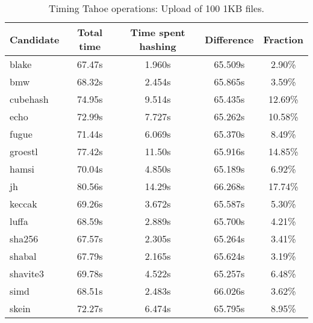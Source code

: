 \begin{table}[h]
  \centering
  \begin{tabular}{ | l | c | c | c | c | }
    \hline
    Candidate & Total time & Time spent hashing & Difference & Fraction \\ \hline
    blake & 67.47s & 1.960s & 65.509s & 2.90\% \\ \hline
    bmw & 68.32s & 2.454s & 65.865s & 3.59\% \\ \hline
    cubehash & 74.95s & 9.514s & 65.435s & 12.69\% \\ \hline
    echo & 72.99s & 7.727s & 65.262s & 10.58\% \\ \hline
    fugue & 71.44s & 6.069s & 65.370s & 8.49\% \\ \hline
    groestl & 77.42s & 11.50s & 65.916s & 14.85\% \\ \hline
    hamsi & 70.04s & 4.850s & 65.189s & 6.92\% \\ \hline
    jh & 80.56s & 14.29s & 66.268s & 17.74\% \\ \hline
    keccak & 69.26s & 3.672s & 65.587s & 5.30\% \\ \hline
    luffa & 68.59s & 2.889s & 65.700s & 4.21\% \\ \hline
    sha256 & 67.57s & 2.305s & 65.264s & 3.41\% \\ \hline
    shabal & 67.79s & 2.165s & 65.624s & 3.19\% \\ \hline
    shavite3 & 69.78s & 4.522s & 65.257s & 6.48\% \\ \hline
    simd & 68.51s & 2.483s & 66.026s & 3.62\% \\ \hline
    skein & 72.27s & 6.474s & 65.795s & 8.95\% \\ \hline
  \end{tabular}
  \caption{Timing Tahoe operations: Upload of 100 1KB files.}
  \label{tbl:hashingtimes:put1kb}
\end{table}

